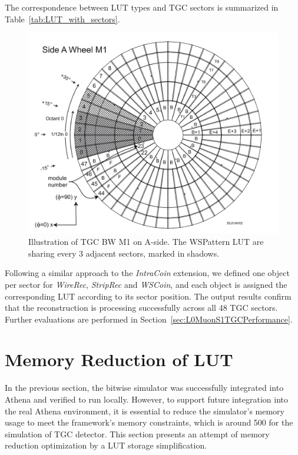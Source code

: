 The correspondence between LUT types and TGC sectors is summarized in Table~\ref{tab:LUT_with_sectors}.


\begin{figure}[htbp]
  \centering
  \includegraphics[width=1.0\textwidth]{figs/chapter5/LUT_sharing.png}
  \caption{Illustration of TGC BW M1 on A-side. The WSPattern LUT are sharing every 3 adjacent sectors, marked in shadows.}
  \label{fig:LUT_sharing}
\end{figure}


Following a similar approach to the \textit{IntraCoin} extension, we defined one object per sector for \textit{WireRec}, \textit{StripRec} and \textit{WSCoin}, and each object is assigned the corresponding LUT according to its sector position. The output results confirm that the reconstruction is processing successfully across all 48 TGC sectors. Further evaluations are performed in Section~\ref{sec:L0MuonS1TGCPerformance}.
\section{Memory Reduction of LUT} \label{sec:MemoryReduction}
In the previous section, the bitwise simulator was successfully integrated into Athena and verified to run locally. However, to support future integration into the real Athena environment, it is essential to reduce the simulator's memory usage to meet the framework's memory constraints, which is around 500  for the simulation of TGC detector. This section presents an attempt of memory reduction optimization by a LUT storage simplification.

